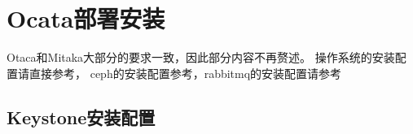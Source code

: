\chapter{Ocata部署安装}

Otaca和Mitaka大部分的要求一致，因此部分内容不再赘述。
操作系统的安装配置请直接参考，
ceph的安装配置参考，rabbitmq的安装配置请参考

\section{Keystone安装配置}
